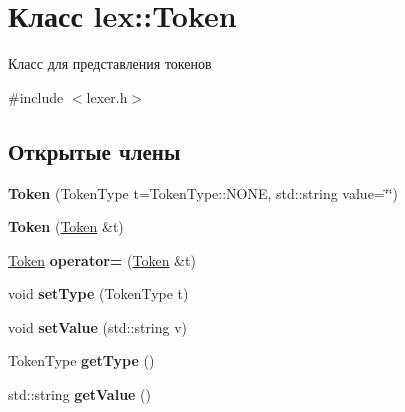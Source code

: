\hypertarget{classlex_1_1_token}{}\section{Класс lex\+:\+:Token}
\label{classlex_1_1_token}


Класс для представления токенов  




{\ttfamily \#include $<$lexer.\+h$>$}

\subsection*{Открытые члены}
\begin{DoxyCompactItemize}
\item 
\mbox{\label{classlex_1_1_token_a6c0d111952542890396445d9f693197f}} 
{\bfseries Token} (Token\+Type t=Token\+Type\+::\+N\+O\+NE, std\+::string value=\char`\"{}\char`\"{})
\item 
\mbox{\label{classlex_1_1_token_a2aecfe08aecdc1899502936dd8995a94}} 
{\bfseries Token} (\hyperlink{classlex_1_1_token}{Token} \&t)
\item 
\mbox{\label{classlex_1_1_token_ae4852777dbda0c82229172774e15a583}} 
\hyperlink{classlex_1_1_token}{Token} {\bfseries operator=} (\hyperlink{classlex_1_1_token}{Token} \&t)
\item 
\mbox{\label{classlex_1_1_token_a0259f9e1504683176217e357101b5a68}} 
void {\bfseries set\+Type} (Token\+Type t)
\item 
\mbox{\label{classlex_1_1_token_ab2e13a9b952b3afa6fe648d6b81e64a5}} 
void {\bfseries set\+Value} (std\+::string v)
\item 
\mbox{\label{classlex_1_1_token_a77574e198178aeb459865f304ce8c22e}} 
Token\+Type {\bfseries get\+Type} ()
\item 
\mbox{\label{classlex_1_1_token_a614cc525749151e1fcbcfdf9005b8c94}} 
std\+::string {\bfseries get\+Value} ()
\end{DoxyCompactItemize}


